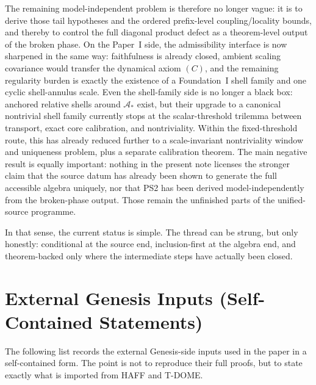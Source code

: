 \documentclass[12pt]{article}
\theoremstyle{definition}
\theoremstyle{remark}
\begin{document}
The remaining model-independent problem is therefore no longer vague: it
is to derive those tail hypotheses and the ordered prefix-level
coupling/locality bounds, and thereby to control the full diagonal
product defect as a theorem-level output of the broken phase.
On the Paper~I side, the admissibility interface is now sharpened in the
same way: faithfulness is already closed, ambient scaling covariance
would transfer the dynamical axiom \((C)\), and the remaining regularity
burden is exactly the existence of a Foundation~I shell family and one
cyclic shell-annulus scale. Even the shell-family side is no longer a
black box: anchored relative shells around \(\mathcal A_*\) exist, but
their upgrade to a canonical nontrivial shell family currently stops at
the scalar-threshold trilemma between transport, exact core
calibration, and nontriviality. Within the fixed-threshold route, this
has already reduced further to a scale-invariant nontriviality window
and uniqueness problem, plus a separate calibration theorem.
The main negative result is equally important: nothing in the present
note licenses the stronger claim that the source datum has already been
shown to generate the full accessible algebra uniquely, nor that PS2 has
been derived model-independently from the broken-phase output. Those
remain the unfinished parts of the unified-source programme.

In that sense, the current status is simple. The thread can be strung,
but only honestly: conditional at the source end, inclusion-first at the
algebra end, and theorem-backed only where the intermediate steps have
actually been closed.

\appendix

\section{External Genesis Inputs (Self-Contained Statements)}\label{app:premises}

The following list records the external Genesis-side inputs used in the
paper in a self-contained form. The point is not to reproduce their full
proofs, but to state exactly what is imported from HAFF and T-DOME.
\end{document}
